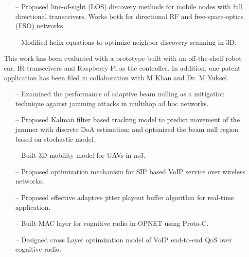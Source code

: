 \documentclass[10pt,times]{article}
\begin{document}
  {
  \begin{itemize}
    \item[--] Proposed line-of-sight (LOS) discovery methods for mobile nodes with full directional transceivers. Works both for directional RF and free-space-optics (FSO) networks.
    \item[--] Modified helix equations to optimize neighbor discovery scanning in 3D.
  \end{itemize}
  This work has been evaluated with a prototype built with an off-the-shelf robot car, IR transceivers and Raspberry Pi as the controller. In addition, one patent application has been filed in collaboration with M Khan and Dr. M Yuksel.
  }



  {
  \begin{itemize}
    \item[--] Examined the performance of adaptive beam nulling as a mitigation technique against jamming attacks in multihop ad hoc networks.
    \item[--] Proposed Kalman filter based tracking model to predict movement of the jammer with discrete DoA estimation; and optimized the beam null region based on stochastic model.
    \item[--] Built 3D mobility model for UAVs in ns3.
  \end{itemize}
  }


  {
  \begin{itemize}
    \item[--] Proposed optimization mechanism for SIP based VoIP service over wireless networks.
    \item[--] Proposed effective adaptive jitter playout buffer algorithm for real-time application.
    \item[--] Built MAC layer for cognitive radio in OPNET using Proto-C.
    \item[--] Designed cross Layer optimization model of VoIP end-to-end QoS over cognitive radio.
  \end{itemize}
  }
\end{document}
